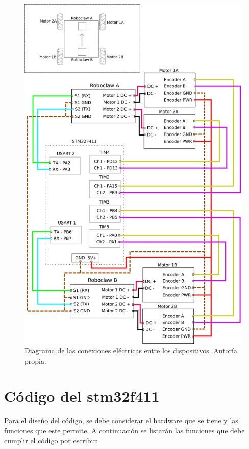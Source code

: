 \begin{figure}[h!]
\centering
\includegraphics[scale=0.63]{imagenes/diagrama_electrico.png}
\caption{Diagrama de las conexiones eléctricas entre los dispositivos. Autoría propia.}
\label{F:conexiones}
\end{figure}

\section{Código del stm32f411}
Para el diseño del código, se debe considerar el hardware que se tiene y las funciones que este permite. A continuación se listarán las funciones que debe cumplir el código por escribir:

